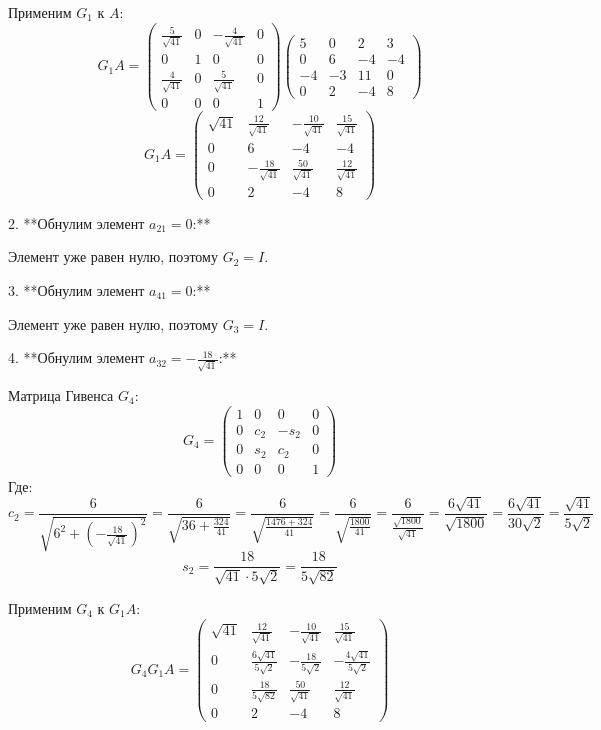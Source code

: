 \documentclass[a4paper,14pt]{article}
\begin{document}
   Применим \( G_1 \) к \( A \):
   \[
   G_1 A = \begin{pmatrix}
   \frac{5}{\sqrt{41}} & 0 & -\frac{4}{\sqrt{41}} & 0 \\
   0 & 1 & 0 & 0 \\
   \frac{4}{\sqrt{41}} & 0 & \frac{5}{\sqrt{41}} & 0 \\
   0 & 0 & 0 & 1
   \end{pmatrix}
   \begin{pmatrix}
   5 & 0 & 2 & 3 \\
   0 & 6 & -4 & -4 \\
   -4 & -3 & 11 & 0 \\
   0 & 2 & -4 & 8
   \end{pmatrix}
   \]
   \[
   G_1 A = \begin{pmatrix}
   \sqrt{41} & \frac{12}{\sqrt{41}} & -\frac{10}{\sqrt{41}} & \frac{15}{\sqrt{41}} \\
   0 & 6 & -4 & -4 \\
   0 & -\frac{18}{\sqrt{41}} & \frac{50}{\sqrt{41}} & \frac{12}{\sqrt{41}} \\
   0 & 2 & -4 & 8
   \end{pmatrix}
   \]

2. **Обнулим элемент \( a_{21} = 0 \):**

   Элемент уже равен нулю, поэтому \( G_2 = I \).

3. **Обнулим элемент \( a_{41} = 0 \):**

   Элемент уже равен нулю, поэтому \( G_3 = I \).

4. **Обнулим элемент \( a_{32} = -\frac{18}{\sqrt{41}} \):**

   Матрица Гивенса \( G_4 \):
   \[
   G_4 = \begin{pmatrix}
   1 & 0 & 0 & 0 \\
   0 & c_2 & -s_2 & 0 \\
   0 & s_2 & c_2 & 0 \\
   0 & 0 & 0 & 1
   \end{pmatrix}
   \]
   Где:
   \[
   c_2 = \frac{6}{\sqrt{6^2 + \left(-\frac{18}{\sqrt{41}}\right)^2}} = \frac{6}{\sqrt{36 + \frac{324}{41}}} = \frac{6}{\sqrt{\frac{1476 + 324}{41}}} = \frac{6}{\sqrt{\frac{1800}{41}}} = \frac{6}{\frac{\sqrt{1800}}{\sqrt{41}}} = \frac{6 \sqrt{41}}{\sqrt{1800}} = \frac{6 \sqrt{41}}{30 \sqrt{2}} = \frac{\sqrt{41}}{5 \sqrt{2}}
   \]
   \[
   s_2 = \frac{18}{\sqrt{41} \cdot 5 \sqrt{2}} = \frac{18}{5 \sqrt{82}}
   \]

   Применим \( G_4 \) к \( G_1 A \):
   \[
   G_4 G_1 A = \begin{pmatrix}
   \sqrt{41} & \frac{12}{\sqrt{41}} & -\frac{10}{\sqrt{41}} & \frac{15}{\sqrt{41}} \\
   0 & \frac{6 \sqrt{41}}{5 \sqrt{2}} & -\frac{18}{5 \sqrt{2}} & -\frac{4 \sqrt{41}}{5 \sqrt{2}} \\
   0 & \frac{18}{5 \sqrt{82}} & \frac{50}{\sqrt{41}} & \frac{12}{\sqrt{41}} \\
   0 & 2 & -4 & 8
   \end{pmatrix}
   \]
\end{document}

